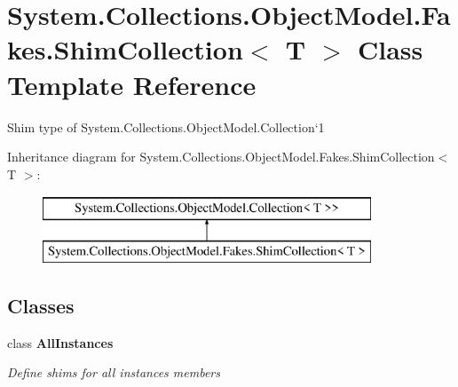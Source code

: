 \hypertarget{class_system_1_1_collections_1_1_object_model_1_1_fakes_1_1_shim_collection_3_01_t_01_4}{\section{System.\-Collections.\-Object\-Model.\-Fakes.\-Shim\-Collection$<$ T $>$ Class Template Reference}
\label{class_system_1_1_collections_1_1_object_model_1_1_fakes_1_1_shim_collection_3_01_t_01_4}
}


Shim type of System.\-Collections.\-Object\-Model.\-Collection`1 


Inheritance diagram for System.\-Collections.\-Object\-Model.\-Fakes.\-Shim\-Collection$<$ T $>$\-:\begin{figure}[H]
\begin{center}
\leavevmode
\includegraphics[height=2.000000cm]{class_system_1_1_collections_1_1_object_model_1_1_fakes_1_1_shim_collection_3_01_t_01_4}
\end{center}
\end{figure}
\subsection*{Classes}
\begin{DoxyCompactItemize}
\item 
class {\bfseries All\-Instances}
\begin{DoxyCompactList}\small\item\em Define shims for all instances members\end{DoxyCompactList}\end{DoxyCompactItemize}
